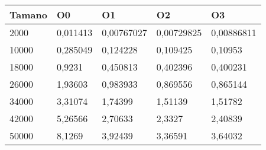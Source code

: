 \begin{tabular}{|l|l|l|l|l|}
	\hline
	Tamano & O0 & O1 & O2 & O3 \\
	\hline
	\hline
	2000 & 0,011413 & 0,00767027 & 0,00729825 & 0,00886811 \\
	\hline
	10000 & 0,285049 & 0,124228 & 0,109425 & 0,10953 \\
	\hline
	18000 & 0,9231 & 0,450813 & 0,402396 & 0,400231 \\
	\hline
	26000 & 1,93603 & 0,983933 & 0,869556 & 0,865144 \\
	\hline
	34000 & 3,31074 & 1,74399 & 1,51139 & 1,51782 \\
	\hline
	42000 & 5,26566 & 2,70633 & 2,3327 & 2,40839 \\
	\hline
	50000 & 8,1269 & 3,92439 & 3,36591 & 3,64032 \\
	\hline
\end{tabular}
